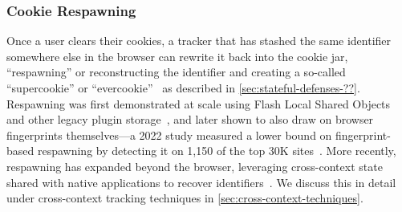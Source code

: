 \subsubsection{Cookie Respawning}
\label{sec:stateful-techniques-cookie-respawning}
Once a user clears their cookies, a tracker that has stashed the same identifier somewhere else in the browser can rewrite it back into the cookie jar, ``respawning'' or reconstructing the identifier and creating a so-called ``supercookie'' or ``evercookie''~\cite{ayensonFlashCookiesPrivacy2011,soltaniFlashCookiesPrivacy2009,acarWebNeverForgets2014} as described in \autoref{sec:stateful-defenses-??}.
%
Respawning was first demonstrated at scale using Flash Local Shared Objects and other legacy plugin storage~\cite{acarWebNeverForgets2014,englehardtOnlineTracking1millionsite2016}, and later shown to also draw on browser fingerprints themselves---a 2022 study measured a lower bound on fingerprint-based respawning by detecting it on 1,150 of the top 30K sites~\cite{fouadMyCookiePhoenix2022}.
%
More recently, respawning has expanded beyond the browser, leveraging cross-context state shared with native applications to recover identifiers~\cite{wessels2025hytrack}.
%
%
We discuss this in detail under cross-context tracking techniques in \autoref{sec:cross-context-techniques}.


